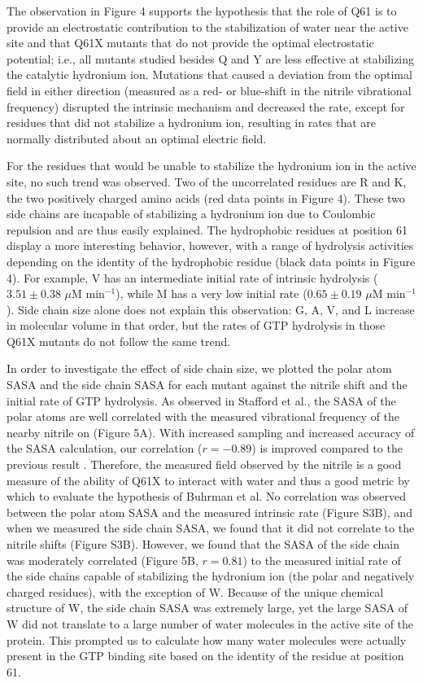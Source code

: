 The observation in Figure 4 supports the hypothesis that the role of Q61 is to provide an electrostatic contribution to the stabilization of water near the active site and that Q61X mutants that do not provide the optimal electrostatic potential; i.e., all mutants studied besides Q and Y are less effective at stabilizing the catalytic hydronium ion. 
Mutations that caused a deviation from the optimal field in either direction (measured as a red- or blue-shift in the nitrile vibrational frequency) disrupted the intrinsic mechanism and decreased the rate, except for residues that did not stabilize a hydronium ion, resulting in rates that are normally distributed about an optimal electric field.

For the residues that would be unable to stabilize the hydronium ion in the active site, no such trend was observed. 
Two of the uncorrelated residues are R and K, the two positively charged amino acids (red data points in Figure 4). 
These two side chains are incapable of stabilizing a hydronium ion due to Coulombic repulsion and are thus easily explained. 
The hydrophobic residues at position 61 display a more interesting behavior, however, with a range of hydrolysis activities depending on the identity of the hydrophobic residue (black data points in Figure 4). 
For example, V has an intermediate initial rate of intrinsic hydrolysis ($3.51 \pm 0.38$ $\mu$M min$^{-1}$), while M has a very low initial rate ($0.65 \pm 0.19$ $\mu$M min$^{-1}$).  
Side chain size alone does not explain this observation: G, A, V, and L increase in molecular volume in that order, but the rates of GTP hydrolysis in those Q61X mutants do not follow the same trend.

In order to investigate the effect of side chain size, we plotted the polar atom SASA and the side chain SASA for each mutant against the nitrile shift and the initial rate of GTP hydrolysis. 
As observed in Stafford et al., the SASA of the polar atoms are well correlated with the measured vibrational frequency of the nearby nitrile on \RalBSCN{} (Figure 5A). 
With increased sampling and increased accuracy of the SASA calculation, our correlation ($r = −0.89$) is improved compared to the previous result \cite{Stafford2012}. 
Therefore, the measured field observed by the nitrile is a good measure of the ability of Q61X to interact with water and thus a good metric by which to evaluate the hypothesis of Buhrman et al. 
No correlation was observed between the polar atom SASA and the measured intrinsic rate (Figure S3B), and when we measured the side chain SASA, we found that it did not correlate to the nitrile shifts (Figure S3B). 
However, we found that the SASA of the side chain was moderately correlated (Figure 5B, $r = 0.81$) to the measured initial rate of the side chains capable of stabilizing the hydronium ion (the polar and negatively charged residues), with the exception of W. 
Because of the unique chemical structure of W, the side chain SASA was extremely large, yet the large SASA of W did not translate to a large number of water molecules in the active site of the protein. 
This prompted us to calculate how many water molecules were actually present in the GTP binding site based on the identity of the residue at position 61.


